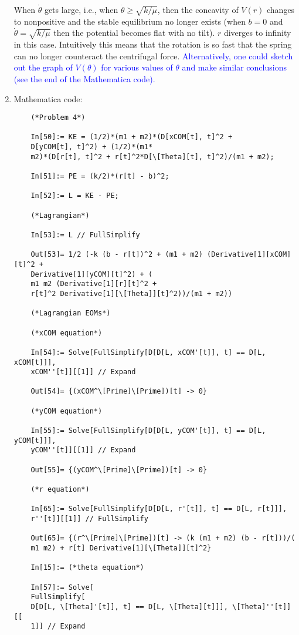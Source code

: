 \documentclass{article}
\theoremstyle{definition}
\begin{document}
\begin{enumerate}[label = (\alph*)]
	
	When $\dot{\theta}$ gets large, i.e., when $\dot{\theta} \geq \sqrt{k/\mu}$, then the concavity of $V(r)$ changes to nonpositive and the stable equilibrium no longer exists (when $b=0$ and $\dot{\theta}=\sqrt{k/\mu}$ then the potential becomes flat with no tilt). $r$ diverges to infinity in this case. Intuitively this means that the rotation is so fast that the spring can no longer counteract the centrifugal force. \textcolor{blue}{Alternatively, one could sketch out the graph of $V(\theta)$ for various values of $\theta$ and make similar conclusions (see the end of the Mathematica code). }
	
	\item Mathematica code:
	\begin{lstlisting}
	(*Problem 4*)
	
	In[50]:= KE = (1/2)*(m1 + m2)*(D[xCOM[t], t]^2 + 
	D[yCOM[t], t]^2) + (1/2)*(m1*
	m2)*(D[r[t], t]^2 + r[t]^2*D[\[Theta][t], t]^2)/(m1 + m2);
	
	In[51]:= PE = (k/2)*(r[t] - b)^2;
	
	In[52]:= L = KE - PE;
	
	(*Lagrangian*)
	
	In[53]:= L // FullSimplify
	
	Out[53]= 1/2 (-k (b - r[t])^2 + (m1 + m2) (Derivative[1][xCOM][t]^2 + 
	Derivative[1][yCOM][t]^2) + (
	m1 m2 (Derivative[1][r][t]^2 + 
	r[t]^2 Derivative[1][\[Theta]][t]^2))/(m1 + m2))
	
	(*Lagrangian EOMs*)
	
	(*xCOM equation*)
	
	In[54]:= Solve[FullSimplify[D[D[L, xCOM'[t]], t] == D[L, xCOM[t]]], 
	xCOM''[t]][[1]] // Expand
	
	Out[54]= {(xCOM^\[Prime]\[Prime])[t] -> 0}
	
	(*yCOM equation*)
	
	In[55]:= Solve[FullSimplify[D[D[L, yCOM'[t]], t] == D[L, yCOM[t]]], 
	yCOM''[t]][[1]] // Expand
	
	Out[55]= {(yCOM^\[Prime]\[Prime])[t] -> 0}
	
	(*r equation*)
	
	In[65]:= Solve[FullSimplify[D[D[L, r'[t]], t] == D[L, r[t]]], 
	r''[t]][[1]] // FullSimplify
	
	Out[65]= {(r^\[Prime]\[Prime])[t] -> (k (m1 + m2) (b - r[t]))/(
	m1 m2) + r[t] Derivative[1][\[Theta]][t]^2}
	
	In[15]:= (*theta equation*)
	
	In[57]:= Solve[
	FullSimplify[
	D[D[L, \[Theta]'[t]], t] == D[L, \[Theta][t]]], \[Theta]''[t]][[
	1]] // Expand
	

\end{lstlisting}
\end{enumerate}
\end{document}

